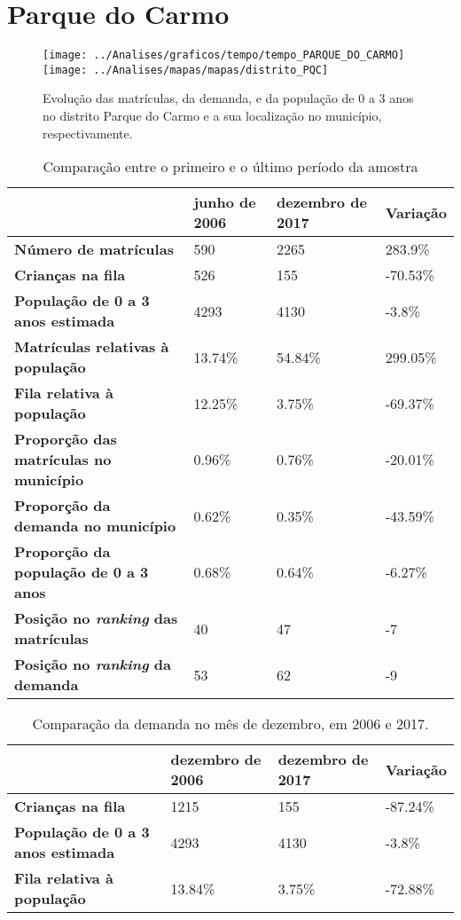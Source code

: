 \section{Parque do Carmo}
\begin{figure}[H]
\centering
\texttt{[image: ../Analises/graficos/tempo/tempo\_PARQUE\_DO\_CARMO]}
\texttt{[image: ../Analises/mapas/mapas/distrito\_PQC]}
\caption{Evolução das matrículas, da demanda, e da população de 0 a 3 anos no distrito Parque do Carmo e a sua localização no município, respectivamente.}
\end{figure}
\begin{table}[H]
\begin{tabular}{l|l|l|l}
\textbf{}                                      & \textbf{junho de 2006}       & \textbf{dezembro de 2017}    & \textbf{Variação} \\ \hline
\textbf{Número de matrículas}                  & 590 & 2265 & 283.9\% \\ \hline
\textbf{Crianças na fila}                      & 526 & 155 & -70.53\% \\ \hline
\textbf{População de 0 a 3 anos estimada}      & 4293 & 4130 & -3.8\% \\ \hline
\textbf{Matrículas relativas à população}      & 13.74\% & 54.84\% & 299.05\% \\ \hline
\textbf{Fila relativa à população}             & 12.25\% & 3.75\% & -69.37\% \\ \hline
\textbf{Proporção das matrículas no município} & 0.96\% & 0.76\% & -20.01\% \\ \hline
\textbf{Proporção da demanda no município}     & 0.62\% & 0.35\% & -43.59\% \\ \hline
\textbf{Proporção da população de 0 a 3 anos}  & 0.68\% & 0.64\% & -6.27\% \\ \hline
\textbf{Posição no \textit{ranking} das matrículas}     & 40 & 47 & -7 \\ \hline
\textbf{Posição no \textit{ranking} da demanda}         & 53 & 62 & -9 \\ 
\end{tabular}
\caption{Comparação entre o primeiro e o último período da amostra}
\end{table}
\begin{table}[H]
\begin{tabular}{l|l|l|l}
\textbf{}                                 & \textbf{dezembro de 2006} & \textbf{dezembro de 2017} & \textbf{Variação} \\ \hline
\textbf{Crianças na fila}                      & 1215 & 155 & -87.24\% \\ \hline
\textbf{População de 0 a 3 anos estimada}      & 4293 & 4130 & -3.8\% \\ \hline
\textbf{Fila relativa à população}             & 13.84\% & 3.75\% & -72.88\% \\
\end{tabular}
\caption{Comparação da demanda no mês de dezembro, em 2006 e 2017.}
\end{table}
